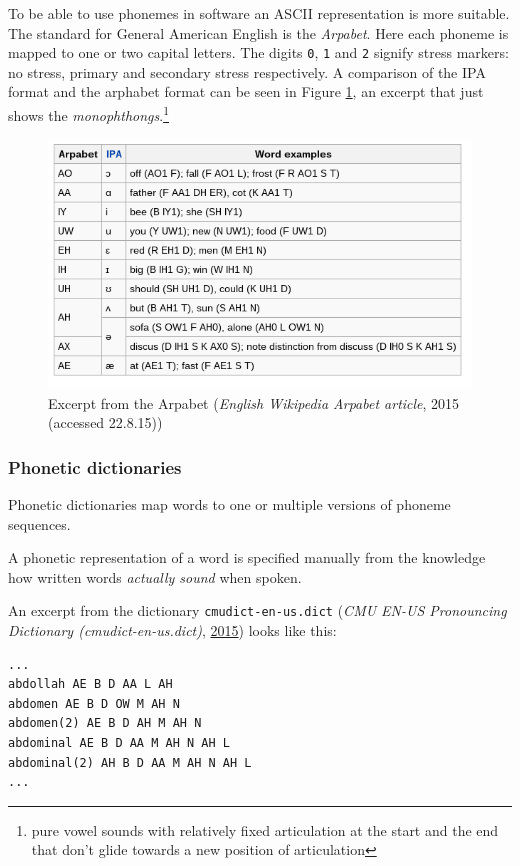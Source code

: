 \documentclass[]{article}
\begin{document}
To be able to use phonemes in software an ASCII representation is more
suitable. The standard for General American English is the
\emph{Arpabet}. Here each phoneme is mapped to one or two capital
letters. The digits \texttt{0}, \texttt{1} and \texttt{2} signify stress
markers: no stress, primary and secondary stress respectively. A
comparison of the IPA format and the arphabet format can be seen in
Figure \ref{arpabet}, an excerpt that just shows the
\emph{monophthongs}.\footnote{pure vowel sounds with relatively fixed
  articulation at the start and the end that don't glide towards a new
  position of articulation}

\begin{figure}[htbp]
\centering
\includegraphics{images/arpabet.png}
\caption{Excerpt from the Arpabet (\emph{English Wikipedia Arpabet
article}, 2015 (accessed 22.8.15)) \label{arpabet}}
\end{figure}

\subsubsection{Phonetic dictionaries}\label{phonetic-dictionaries}

Phonetic dictionaries map words to one or multiple versions of phoneme
sequences.

A phonetic representation of a word is specified manually from the
knowledge how written words \emph{actually sound} when spoken.

An excerpt from the dictionary \texttt{cmudict-en-us.dict} (\emph{CMU
EN-US Pronouncing Dictionary (cmudict-en-us.dict)},
\hyperref[ref-cmuDict]{2015}) looks like this:

\begin{verbatim}
...
abdollah AE B D AA L AH
abdomen AE B D OW M AH N
abdomen(2) AE B D AH M AH N
abdominal AE B D AA M AH N AH L
abdominal(2) AH B D AA M AH N AH L
...
\end{verbatim}
\end{document}
